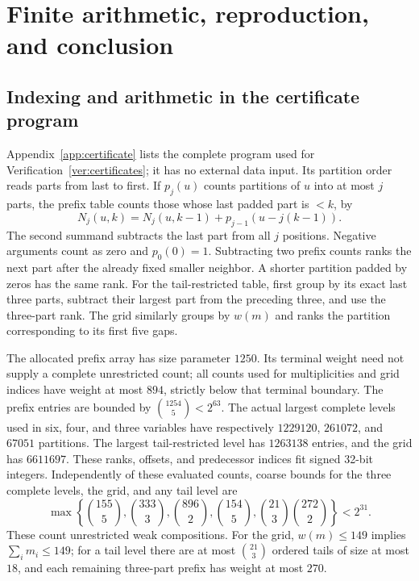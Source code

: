 \section{Finite arithmetic, reproduction, and conclusion}\label{sec:verification}

\subsection{Indexing and arithmetic in the certificate program}
Appendix~\ref{app:certificate} lists the complete program used for
Verification~\ref{ver:certificates}; it has no external data input.
Its partition order reads parts from last to first. If \(p_j(u)\)
counts partitions of \(u\) into at most \(j\) parts, the prefix table
counts those whose last padded part is \(<k\), by
\[
 N_j(u,k)=N_j(u,k-1)+p_{j-1}(u-j(k-1)).
\]
The second summand subtracts the last part from all \(j\) positions.
Negative arguments count as zero and \(p_0(0)=1\).
Subtracting two prefix counts ranks the next part after the already
fixed smaller neighbor. A shorter partition padded by zeros has the
same rank. For the tail-restricted table, first group by its exact last
three parts, subtract their largest part from the preceding three, and
use the three-part rank. The grid similarly groups by \(w(m)\) and ranks
the partition corresponding to its first five gaps.

The allocated prefix array has size parameter \(1250\). Its terminal
weight need not supply a complete unrestricted count; all counts used
for multiplicities and grid indices have weight at most \(894\), strictly
below that terminal boundary. The prefix entries are bounded by
\(\binom{1254}{5}<2^{63}\).
The actual largest complete levels used in six, four, and three variables
have respectively \(1229120\), \(261072\), and \(67051\) partitions.
The largest tail-restricted level has \(1263138\) entries, and the grid
has \(6611697\). These ranks, offsets, and predecessor indices fit signed
32-bit integers. Independently of these evaluated counts, coarse bounds
for the three complete levels, the grid, and any tail level are
\[
 \max\left\{\binom{155}{5},\binom{333}{3},\binom{896}{2},
             \binom{154}{5},\binom{21}{3}\binom{272}{2}\right\}<2^{31}.
\]
These count unrestricted weak compositions. For the grid,
\(w(m)\le149\) implies \(\sum_i m_i\le149\); for a tail level there
are at most \(\binom{21}{3}\) ordered tails of size at most \(18\), and
each remaining three-part prefix has weight at most \(270\).

